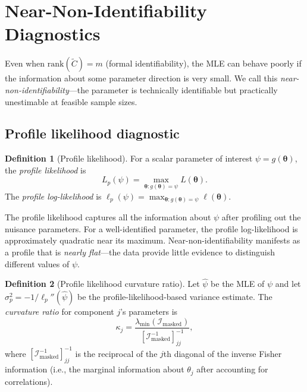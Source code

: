 \documentclass[11pt]{article}
\theoremstyle{definition}
\newtheorem{definition}{Definition}
\theoremstyle{plain}
\renewcommand{\v}[1]{\boldsymbol{#1}}
\newcommand{\btheta}{\v{\theta}}
\newcommand{\rank}{\mathrm{rank}}
\newcommand{\FI}{\mathcal{I}}       %
\newcommand{\Ctilde}{\tilde{C}}
\begin{document}

\section{Near-Non-Identifiability Diagnostics}
\label{sec:diagnostics}

Even when $\rank(\Ctilde) = m$ (formal identifiability), the MLE
can behave poorly if the information about some parameter direction
is very small.
We call this \emph{near-non-identifiability}---the parameter is
technically identifiable but practically unestimable at feasible
sample sizes.

\subsection{Profile likelihood diagnostic}

\begin{definition}[Profile likelihood]
\label{def:profile-likelihood}
For a scalar parameter of interest $\psi = g(\btheta)$, the
\emph{profile likelihood} is
\begin{equation}
    L_p(\psi) = \max_{\btheta: g(\btheta) = \psi} L(\btheta).
\end{equation}
The \emph{profile log-likelihood} is
$\ell_p(\psi) = \max_{\btheta: g(\btheta) = \psi} \ell(\btheta)$.
\end{definition}

The profile likelihood captures all the information about $\psi$
after profiling out the nuisance parameters.
For a well-identified parameter, the profile log-likelihood is
approximately quadratic near its maximum.
Near-non-identifiability manifests as a profile that is
\emph{nearly flat}---the data provide little evidence to distinguish
different values of $\psi$.

\begin{definition}[Profile likelihood curvature ratio]
\label{def:ridge-ratio}
Let $\hat{\psi}$ be the MLE of $\psi$ and let
$\sigma^2_p = -1/\ell_p''(\hat{\psi})$ be the profile-likelihood-based
variance estimate.
The \emph{curvature ratio} for component $j$'s parameters is
\begin{equation}
\label{eq:curvature-ratio}
    \kappa_j = \frac{\lambda_{\min}(\FI_{\mathrm{masked}})}
                    {[\FI_{\mathrm{masked}}^{-1}]_{jj}^{-1}},
\end{equation}
where $[\FI_{\mathrm{masked}}^{-1}]_{jj}^{-1}$ is the reciprocal
of the $j$th diagonal of the inverse Fisher information
(i.e., the marginal information about $\theta_j$ after accounting
for correlations).
\end{definition}
\end{document}
